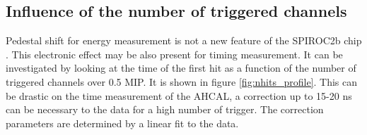 \subsection{Influence of the number of triggered channels}
\label{subsec:ped_shift}

Pedestal shift for energy measurement is not a new feature of the SPIROC2b chip \cite{OskarMaster}. This electronic effect may be also present for timing measurement. It can be investigated by looking at the time of the first hit as a function of the number of triggered channels over 0.5 MIP. It is shown in figure \ref{fig:nhits_profile}. This can be drastic on the time measurement of the AHCAL, a correction up to 15-20 ns can be necessary to the data for a high number of trigger. The correction parameters are determined by a linear fit to the data.

